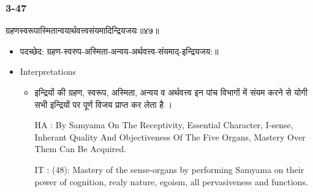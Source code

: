 \begin{frame}[fragile]\frametitle{3-47}
\begin{sanskrit}
ग्रहणस्वरूपास्मितान्वयार्थवत्त्वसंयमादिन्द्रियजयः॥४७॥
\end{sanskrit}

	\begin{itemize}
	\item पदच्छेद:  ग्रहण-स्वरुप-अस्मिता-अन्वय-अर्थवत्त्व-संयमाद्-इन्द्रियजय:॥
	\item Interpretations
		\begin{itemize}	
		\item  इन्द्रियों की ग्रहण, स्वरूप, अस्मिता, अन्वय व अर्थवत्त्व इन पांच विभागों में संयम करने से योगी सभी इन्द्रियों पर पूर्ण विजय प्राप्त कर लेता है ।
		\item [HA]: By Samyama On The Receptivity, Essential Character, I-sense, Inherant Quality And Objectiveness Of The Five Organs, Mastery Over Them Can Be Acquired.
		\item [IT]: (48): Mastery of the sense-organs by performing Samyama on their power of cognition, realy nature, egoism, all pervasiveness and functions.
		\end{itemize}
	\end{itemize}
\end{frame}

